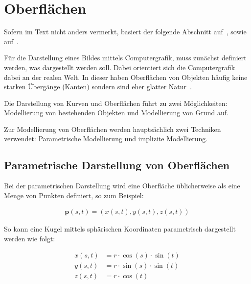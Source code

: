
\section{Oberflächen}
\label{sec:surfaces}

Sofern im Text nicht anders vermerkt, basiert der folgende Abschnitt
auf~\cite[S. 1ff]{menon_introduction_1996}, sowie
auf~\cite[S. 79 bis 115]{glassner_introduction_1989}.

Für die Darstellung eines Bildes mittels Computergrafik, muss zunächst
definiert werden, was dargestellt werden soll. Dabei orientiert sich die
Computergrafik dabei an der realen Welt.  In dieser haben Oberflächen
von Objekten häufig keine starken Übergänge (Kanten) sondern sind eher
glatter Natur~\parencite[S.  471]{foley_computer_1996}.

Die Darstellung von Kurven und Oberflächen führt zu zwei Möglichkeiten:
Modellierung von bestehenden Objekten und Modellierung von Grund auf.

Zur Modellierung von Oberflächen werden hauptsächlich zwei Techniken verwendet:
Parametrische Modellierung und implizite Modellierung.

\subsection{Parametrische Darstellung von Oberflächen}
\label{subsec:surfaces:display:parametric}

Bei der parametrischen Darstellung wird eine Oberfläche üblicherweise als
eine Menge von Punkten definiert, so zum
Beispiel:

\begin{gather}\label{eq:surface_parametric}
    \bm{p}(s, t) = (x(s, t), y(s, t), z(s, t))
\end{gather}

So kann eine Kugel mittels sphärischen Koordinaten parametrisch
dargestellt werden wie folgt:

\begin{align}\label{eq:sphere_parametric}
    x(s, t) &= r \cdot \cos(s) \cdot \sin(t) \\
    y(s, t) &= r \cdot \sin(s) \cdot \sin(t) \\
    z(s, t) &= r \cdot \cos(t)
\end{align}


